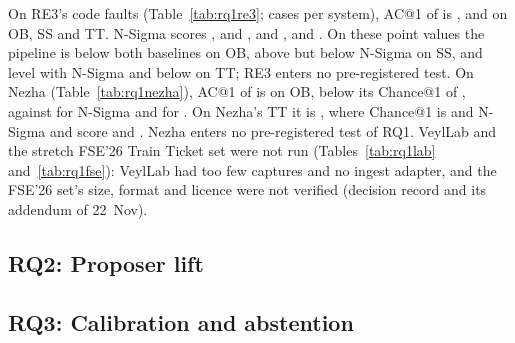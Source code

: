 On RE3's code faults (Table~\ref{tab:rq1re3};  cases per system), AC@1 of  is ,  and  on OB, SS and TT.
N-Sigma scores ,  and , and  ,  and .
On these point values the pipeline is below both baselines on OB, above  but below N-Sigma on SS, and level with N-Sigma and below  on TT; RE3 enters no pre-registered test.
On Nezha (Table~\ref{tab:rq1nezha}), AC@1 of  is  on OB, below its Chance@1 of , against  for N-Sigma and  for .
On Nezha's TT it is , where Chance@1 is  and N-Sigma and  score  and .
Nezha enters no pre-registered test of RQ1.
VeylLab and the stretch FSE'26 Train Ticket set were not run (Tables~\ref{tab:rq1lab} and~\ref{tab:rq1fse}): VeylLab had too few captures and no ingest adapter, and the FSE'26 set's size, format and licence were not verified (decision record \allowbreak{} and its addendum of 22~Nov).

\subsection{RQ2: Proposer lift}
\label{sec:rq2}


\subsection{RQ3: Calibration and abstention}
\label{sec:rq3}

